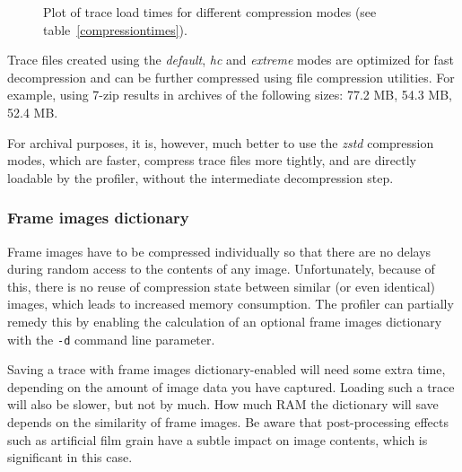 \documentclass[hidelinks,titlepage,a4paper]{article}
\begin{document}
\begin{figure}[H]
\centering{}
\caption{Plot of trace load times for different compression modes (see table~\ref{compressiontimes}).}
\label{loadtime}
\end{figure}

Trace files created using the \emph{default}, \emph{hc} and \emph{extreme} modes are optimized for fast decompression and can be further compressed using file compression utilities. For example, using 7-zip results in archives of the following sizes: 77.2 MB, 54.3 MB, 52.4 MB.

For archival purposes, it is, however, much better to use the \emph{zstd} compression modes, which are faster, compress trace files more tightly, and are directly loadable by the profiler, without the intermediate decompression step.

\subsubsection{Frame images dictionary}
\label{fidict}

Frame images have to be compressed individually so that there are no delays during random access to the contents of any image. Unfortunately, because of this, there is no reuse of compression state between similar (or even identical) images, which leads to increased memory consumption. The profiler can partially remedy this by enabling the calculation of an optional frame images dictionary with the \texttt{-d} command line parameter.

Saving a trace with frame images dictionary-enabled will need some extra time, depending on the amount of image data you have captured. Loading such a trace will also be slower, but not by much. How much RAM the dictionary will save depends on the similarity of frame images. Be aware that post-processing effects such as artificial film grain have a subtle impact on image contents, which is significant in this case.
\end{document}
